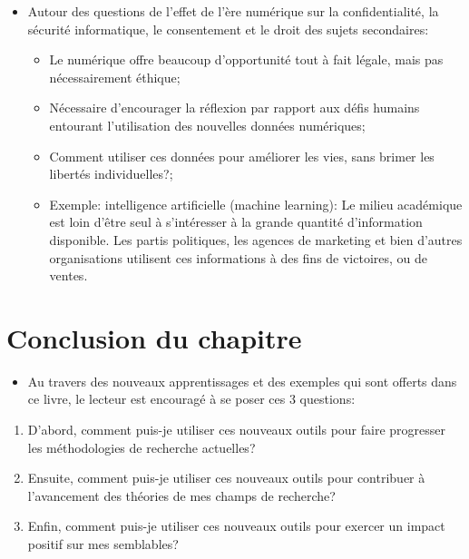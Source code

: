 \documentclass[
  letterpaper,
  DIV=11,
  numbers=noendperiod]{scrreprt}
\providecommand{\tightlist}{%
  \setlength{\itemsep}{0pt}\setlength{\parskip}{0pt}}\usepackage{longtable,booktabs,array}
\begin{document}
\begin{itemize}
\tightlist
\item
  Autour des questions de l'effet de l'ère numérique sur la
  confidentialité, la sécurité informatique, le consentement et le droit
  des sujets secondaires:

  \begin{itemize}
  \tightlist
  \item
    Le numérique offre beaucoup d'opportunité tout à fait légale, mais
    pas nécessairement éthique;
  \item
    Nécessaire d'encourager la réflexion par rapport aux défis humains
    entourant l'utilisation des nouvelles données numériques;
  \item
    Comment utiliser ces données pour améliorer les vies, sans brimer
    les libertés individuelles?;
  \item
    Exemple: intelligence artificielle (machine learning): Le milieu
    académique est loin d'être seul à s'intéresser à la grande quantité
    d'information disponible. Les partis politiques, les agences de
    marketing et bien d'autres organisations utilisent ces informations
    à des fins de victoires, ou de ventes.
  \end{itemize}
\end{itemize}

\hypertarget{conclusion-du-chapitre}{%
\section{Conclusion du chapitre}\label{conclusion-du-chapitre}}

\begin{itemize}
\tightlist
\item
  Au travers des nouveaux apprentissages et des exemples qui sont
  offerts dans ce livre, le lecteur est encouragé à se poser ces 3
  questions:
\end{itemize}

\begin{enumerate}
\def\labelenumi{\arabic{enumi}.}
\tightlist
\item
  D'abord, comment puis-je utiliser ces nouveaux outils pour faire
  progresser les méthodologies de recherche actuelles?
\item
  Ensuite, comment puis-je utiliser ces nouveaux outils pour contribuer
  à l'avancement des théories de mes champs de recherche?
\item
  Enfin, comment puis-je utiliser ces nouveaux outils pour exercer un
  impact positif sur mes semblables?
\end{enumerate}
\end{document}
